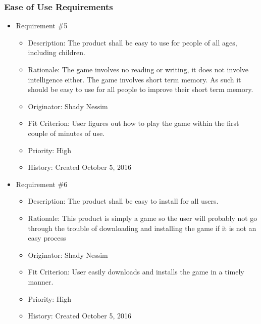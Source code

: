 \documentclass[12pt, titlepage]{article}
\begin{document}
\subsubsection{Ease of Use Requirements}
\begin{itemize}

\item Requirement \#5
\begin{itemize}  
\item Description: The product shall be easy to use for people of all ages, including children. 
\item Rationale: The game involves no reading or writing, it does not involve intelligence either. The game involves short term memory. As such it should be easy to use for all people to improve their short term memory.
\item Originator: Shady Nessim 
\item Fit Criterion: User figures out how to play the game within the first couple of minutes of use. 
\item Priority: High 
\item History: Created October 5, 2016
\end{itemize}

\item Requirement \#6
\begin{itemize}  
\item Description: The product shall be easy to install for all users. 
\item Rationale: This product is simply a game so the user will probably not go through the trouble of downloading and installing the game if it is not an easy process
\item Originator: Shady Nessim 
\item Fit Criterion: User easily downloads and installs the game in a timely manner. 
\item Priority: High 
\item History: Created October 5, 2016
\end{itemize}

\end{itemize}
\end{document}
